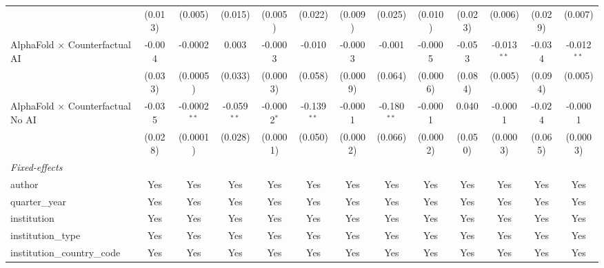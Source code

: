 \begin{tabular}{lcccccccccccc}
                                            & (0.013)       & (0.005)        & (0.015)       & (0.005)       & (0.022)       & (0.009)      & (0.025)       & (0.010)      & (0.023)     & (0.006)       & (0.029) & (0.007)\\   
   AlphaFold $\times$ Counterfactual AI     & -0.004        & -0.0002        & 0.003         & -0.0003       & -0.010        & -0.0003      & -0.001        & -0.0005      & -0.053      & -0.013$^{**}$ & -0.034  & -0.012$^{**}$\\   
                                            & (0.033)       & (0.0005)       & (0.033)       & (0.0003)      & (0.058)       & (0.0009)     & (0.064)       & (0.0006)     & (0.084)     & (0.005)       & (0.094) & (0.005)\\   
   AlphaFold $\times$ Counterfactual No AI  & -0.035        & -0.0002$^{**}$ & -0.059$^{**}$ & -0.0002$^{*}$ & -0.139$^{**}$ & -0.0001      & -0.180$^{**}$ & -0.0001      & 0.040       & -0.0001       & -0.024  & -0.0001\\   
                                            & (0.028)       & (0.0001)       & (0.028)       & (0.0001)      & (0.050)       & (0.0002)     & (0.066)       & (0.0002)     & (0.050)     & (0.0003)      & (0.065) & (0.0003)\\   
   \midrule
   \emph{Fixed-effects}\\
   author                                   & Yes           & Yes            & Yes           & Yes           & Yes           & Yes          & Yes           & Yes          & Yes         & Yes           & Yes     & Yes\\  
   quarter\_year                            & Yes           & Yes            & Yes           & Yes           & Yes           & Yes          & Yes           & Yes          & Yes         & Yes           & Yes     & Yes\\  
   institution                              & Yes           & Yes            & Yes           & Yes           & Yes           & Yes          & Yes           & Yes          & Yes         & Yes           & Yes     & Yes\\  
   institution\_type                        & Yes           & Yes            & Yes           & Yes           & Yes           & Yes          & Yes           & Yes          & Yes         & Yes           & Yes     & Yes\\  
   institution\_country\_code               & Yes           & Yes            & Yes           & Yes           & Yes           & Yes          & Yes           & Yes          & Yes         & Yes           & Yes     & Yes\\  

\end{tabular}
